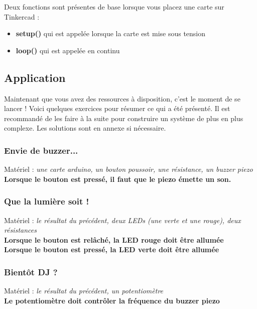 \br
Deux fonctions sont présentes de base lorsque vous placez une carte sur Tinkercad :
\begin{itemize}
	\item \textbf{setup()} qui est appelée lorsque la carte est mise sous tension
	\item \textbf{loop()} qui est appelée en continu
\end{itemize}



\clearpage
\subsection{Application}
Maintenant que vous avez des ressources à disposition, c'est le moment de se lancer !
Voici quelques exercices pour résumer ce qui a été présenté.
Il est recommandé de les faire à la suite pour construire un système de plus en plus complexe.
Les solutions sont en annexe si nécessaire.

\subsubsection{Envie de buzzer...}
Matériel : \textit{une carte arduino, un bouton poussoir, une résistance, un buzzer piezo}
\\
\textbf{Lorsque le bouton est pressé, il faut que le piezo émette un son.}

\subsubsection{Que la lumière soit !}
Matériel : \textit{le résultat du précédent, deux LEDs (une verte et une rouge), deux résistances}
\\
\textbf{Lorsque le bouton est relâché, la LED rouge doit être allumée}
\\
\textbf{Lorsque le bouton est pressé, la LED verte doit être allumée}

\subsubsection{Bientôt DJ ?}
Matériel : \textit{le résultat du précédent, un potentiomètre}
\\
\textbf{Le potentiomètre doit contrôler la fréquence du buzzer piezo}


